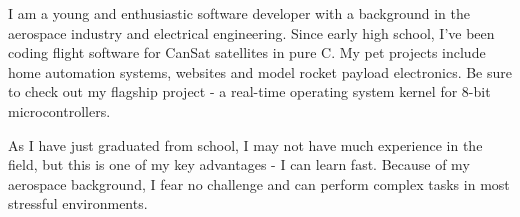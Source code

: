 \documentclass[letter,10pt]{article}
\begin{document}
\begin{justify}
\setlength{\parindent}{0pt}
I am a young and enthusiastic software developer with a background in the aerospace industry and electrical engineering. Since early high school, I've been coding flight software for CanSat satellites in pure C. My pet projects include home automation systems, websites and model rocket payload electronics. Be sure to check out my flagship project - a real-time operating system kernel for 8-bit microcontrollers.
\vspace{1em}

As I have just graduated from school, I may not have much experience in the field, but this is one of my key advantages - I can learn fast. Because of my aerospace background, I fear no challenge and can perform complex tasks in most stressful environments.
\end{justify}
\end{document}
